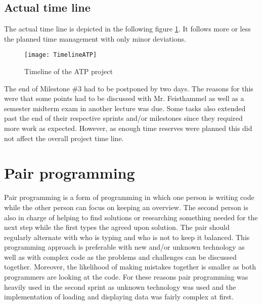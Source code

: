 \subsection{Actual time line}
The actual time line is depicted in the following figure \ref{timelineATP}. It follows more or less the planned time management with only minor deviations.
\begin{figure}[H]
	\centering
	\texttt{[image: TimelineATP]}
	\caption{Timeline of the ATP project}
	\label{timelineATP}
\end{figure}
The end of Milestone \#3 had to be postponed by two days. The reasons for this were that some points had to be discussed with Mr. Feisthammel as well as a semester midterm exam in another lecture was due. Some tasks also extended past the end of their respective sprints and/or milestones since they required more work as expected. However, as enough time reserves were planned this did not affect the overall project time line.

\section{Pair programming}
Pair programming \cite{pairprogramming-url} is a form of programming in which one person is writing code while the other person can focus on keeping an overview. The second person is also in charge of helping to find solutions or researching something needed for the next step while the first types the agreed upon solution. The pair should regularly alternate with who is typing and who is not to keep it balanced. This programming approach is preferable with new and/or unknown technology as well as with complex code as the problems and challenges can be discussed together. Moreover, the likelihood of making mistakes together is smaller as both programmers are looking at the code. For these reasons pair programming was heavily used in the second sprint as unknown technology was used and the implementation of loading and displaying data was fairly complex at first. 

